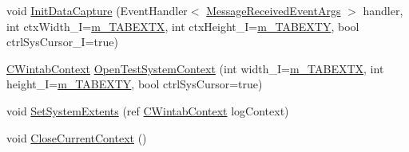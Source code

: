 \begin{DoxyCompactItemize}
\item 
void \mbox{\hyperlink{class_paint___program_1_1_tablet_info_ae3eaec5febf23138a724e6b5d94d2e9a}{Init\+Data\+Capture}} (Event\+Handler$<$ \mbox{\hyperlink{class_wintab_d_n_1_1_message_received_event_args}{Message\+Received\+Event\+Args}} $>$ handler, int ctx\+Width\+\_\+I=\mbox{\hyperlink{class_paint___program_1_1_tablet_info_aec96087301274b16e37ad97d9d86f2a8}{m\+\_\+\+T\+A\+B\+E\+X\+TX}}, int ctx\+Height\+\_\+I=\mbox{\hyperlink{class_paint___program_1_1_tablet_info_a694255f1b42334dcd3c05f6ff9b0ff6d}{m\+\_\+\+T\+A\+B\+E\+X\+TY}}, bool ctrl\+Sys\+Cursor\+\_\+I=true)
\item 
\mbox{\hyperlink{class_wintab_d_n_1_1_c_wintab_context}{C\+Wintab\+Context}} \mbox{\hyperlink{class_paint___program_1_1_tablet_info_ab02b5950a6b9f9c29104a2d68d2ba26b}{Open\+Test\+System\+Context}} (int width\+\_\+I=\mbox{\hyperlink{class_paint___program_1_1_tablet_info_aec96087301274b16e37ad97d9d86f2a8}{m\+\_\+\+T\+A\+B\+E\+X\+TX}}, int height\+\_\+I=\mbox{\hyperlink{class_paint___program_1_1_tablet_info_a694255f1b42334dcd3c05f6ff9b0ff6d}{m\+\_\+\+T\+A\+B\+E\+X\+TY}}, bool ctrl\+Sys\+Cursor=true)
\item 
void \mbox{\hyperlink{class_paint___program_1_1_tablet_info_aa34192cb8b5aad8e9741543b8cafb217}{Set\+System\+Extents}} (ref \mbox{\hyperlink{class_wintab_d_n_1_1_c_wintab_context}{C\+Wintab\+Context}} log\+Context)
\item 
void \mbox{\hyperlink{class_paint___program_1_1_tablet_info_aff74e48af72f51c33129c437db898103}{Close\+Current\+Context}} ()
\end{DoxyCompactItemize}
